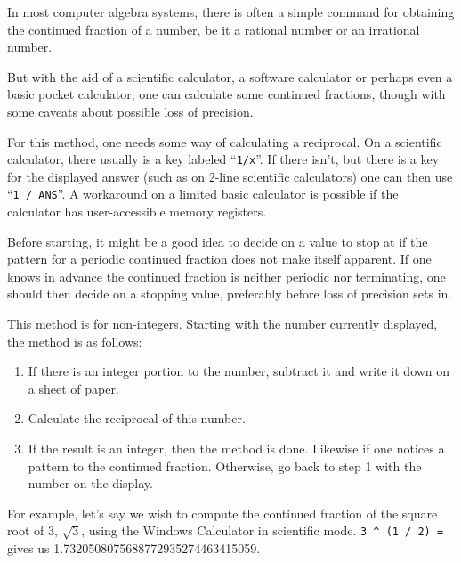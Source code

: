 \documentclass[12pt]{article}
\begin{document}
In most computer algebra systems, there is often a simple command for obtaining the continued fraction of a number, be it a rational number or an irrational number.

But with the aid of a scientific calculator, a software calculator or perhaps even a basic pocket calculator, one can calculate some continued fractions, though with some caveats about possible loss of precision.

For this method, one needs some way of calculating a reciprocal. On a scientific calculator, there usually is a key labeled ``\verb=1/x=''. If there isn't, but there is a key for the displayed answer (such as on 2-line scientific calculators) one can then use ``\verb=1 / ANS=''. A workaround on a limited basic calculator is possible if the calculator has user-accessible memory registers.

Before starting, it might be a good idea to decide on a value to stop at if the pattern for a periodic continued fraction does not make itself apparent. If one knows in advance the continued fraction is neither periodic nor terminating, one should then decide on a stopping value, preferably before loss of precision sets in.

This method is for non-integers. Starting with the number currently displayed, the method is as follows:

\begin{enumerate}
\item If there is an integer portion to the number, subtract it and write it down on a sheet of paper.
\item Calculate the reciprocal of this number.
\item If the result is an integer, then the method is done. Likewise if one notices a pattern to the continued fraction. Otherwise, go back to step 1 with the number on the display.
\end{enumerate}

For example, let's say we wish to compute the continued fraction of the square root of 3, $\sqrt{3}$, using the Windows Calculator in scientific mode. \verb'3 ^ (1 / 2) = ' gives us 1.7320508075688772935274463415059.
\end{document}
